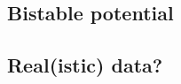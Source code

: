 \documentclass[10pt]{article}
\begin{document}
\subsection{Bistable potential}

\subsection{Real(istic) data?}



\end{document}
